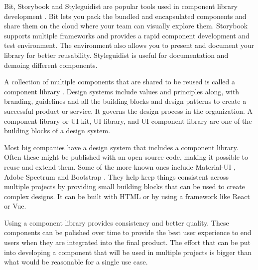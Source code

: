 \documentclass{master_thesis}
\begin{document}
Bit, Storybook and Styleguidist are popular tools used in component library development \citep{Ella2019}. Bit lets you pack the bundled and encapsulated components and share them on the cloud where your team can visually explore them. Storybook supports multiple frameworks and provides a rapid component development and test environment. The environment also allows you to present and document your library for better reusability. Styleguidist is useful for documentation and demoing different components.

A collection of multiple components that are shared to be reused is called a component library \citep{Ramotion2022}. Design systems include values and principles along, with branding, guidelines and all the building blocks and design patterns to create a successful product or service. It governs the design process in the organization. A component library or UI kit, UI library, and UI component library are one of the building blocks of a design system.

Most big companies have a design system that includes a component library. Often these might be published with an open source code, making it possible to reuse and extend them. Some of the more known ones include Material-UI \citep{MUS}, Adobe Spectrum \citep{Adobe} and Bootstrap \citep{Collings}. They help keep things consistent across multiple projects by providing small building blocks that can be used to create complex designs.  It can be built with HTML or by using a framework like React or Vue.

Using a component library provides consistency and better quality. These components can be polished over time to provide the best user experience to end users when they are integrated into the final product. The effort that can be put into developing a component that will be used in multiple projects is bigger than what would be reasonable for a single use case.
\end{document}
